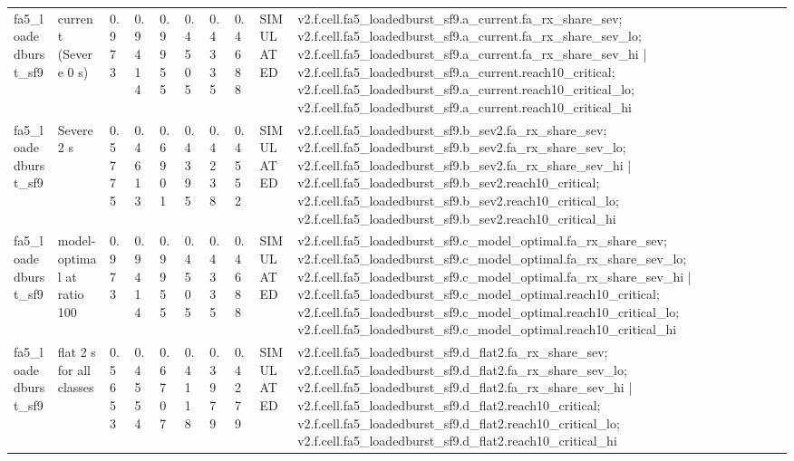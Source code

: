 \begin{table}[t]
\begin{tabular}{llllllllll}
fa5\_loadedburst\_sf9 & current (Severe 0 s) & 0.973 & 0.9414 & 0.9955 & 0.4505 & 0.4335 & 0.4688 & SIMULATED & v2.f.cell.fa5\_loadedburst\_sf9.a\_current.fa\_rx\_share\_sev; v2.f.cell.fa5\_loadedburst\_sf9.a\_current.fa\_rx\_share\_sev\_lo; v2.f.cell.fa5\_loadedburst\_sf9.a\_current.fa\_rx\_share\_sev\_hi | v2.f.cell.fa5\_loadedburst\_sf9.a\_current.reach10\_critical; v2.f.cell.fa5\_loadedburst\_sf9.a\_current.reach10\_critical\_lo; v2.f.cell.fa5\_loadedburst\_sf9.a\_current.reach10\_critical\_hi \\
fa5\_loadedburst\_sf9 & Severe 2 s & 0.5775 & 0.4613 & 0.6901 & 0.4395 & 0.4238 & 0.4552 & SIMULATED & v2.f.cell.fa5\_loadedburst\_sf9.b\_sev2.fa\_rx\_share\_sev; v2.f.cell.fa5\_loadedburst\_sf9.b\_sev2.fa\_rx\_share\_sev\_lo; v2.f.cell.fa5\_loadedburst\_sf9.b\_sev2.fa\_rx\_share\_sev\_hi | v2.f.cell.fa5\_loadedburst\_sf9.b\_sev2.reach10\_critical; v2.f.cell.fa5\_loadedburst\_sf9.b\_sev2.reach10\_critical\_lo; v2.f.cell.fa5\_loadedburst\_sf9.b\_sev2.reach10\_critical\_hi \\
fa5\_loadedburst\_sf9 & model-optimal at ratio 100 & 0.973 & 0.9414 & 0.9955 & 0.4505 & 0.4335 & 0.4688 & SIMULATED & v2.f.cell.fa5\_loadedburst\_sf9.c\_model\_optimal.fa\_rx\_share\_sev; v2.f.cell.fa5\_loadedburst\_sf9.c\_model\_optimal.fa\_rx\_share\_sev\_lo; v2.f.cell.fa5\_loadedburst\_sf9.c\_model\_optimal.fa\_rx\_share\_sev\_hi | v2.f.cell.fa5\_loadedburst\_sf9.c\_model\_optimal.reach10\_critical; v2.f.cell.fa5\_loadedburst\_sf9.c\_model\_optimal.reach10\_critical\_lo; v2.f.cell.fa5\_loadedburst\_sf9.c\_model\_optimal.reach10\_critical\_hi \\
fa5\_loadedburst\_sf9 & flat 2 s for all classes & 0.5653 & 0.4554 & 0.6707 & 0.4118 & 0.3979 & 0.4279 & SIMULATED & v2.f.cell.fa5\_loadedburst\_sf9.d\_flat2.fa\_rx\_share\_sev; v2.f.cell.fa5\_loadedburst\_sf9.d\_flat2.fa\_rx\_share\_sev\_lo; v2.f.cell.fa5\_loadedburst\_sf9.d\_flat2.fa\_rx\_share\_sev\_hi | v2.f.cell.fa5\_loadedburst\_sf9.d\_flat2.reach10\_critical; v2.f.cell.fa5\_loadedburst\_sf9.d\_flat2.reach10\_critical\_lo; v2.f.cell.fa5\_loadedburst\_sf9.d\_flat2.reach10\_critical\_hi \\
\bottomrule
\end{tabular}
\end{table}
